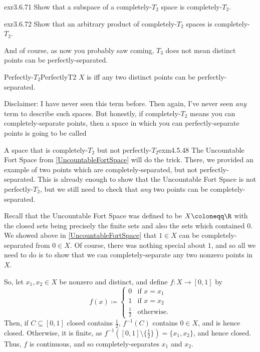 \begin{exr}{}{exr3.6.71}
Show that a subspace of a completely-$T_2$ space is completely-$T_2$.
\end{exr}
\begin{exr}{}{exr3.6.72}
Show that an arbitrary product of completely-$T_2$ spaces is completely-$T_2$.
\end{exr}

And of course, as now you probably saw coming, $T_3$ does not mean distinct points can be perfectly-separated.
\begin{dfn}{Perfectly-$T_2$}{PerfectlyT2}
$X$ is  iff any two distinct points can be perfectly-separated.
\begin{rmk}
Disclaimer:  I have never seen this term before.  Then again, I've never seen \emph{any} term to describe such spaces.  But honestly, if completely-$T_2$ means you can completely-separate points, then a space in which you can perfectly-separate points is going to be called \textellipsis
\end{rmk}
\end{dfn}
\begin{exm}{A space that is completely-$T_2$ but not perfectly-$T_2$}{exm4.5.48}
The Uncountable Fort Space from \cref{UncountableFortSpace} will do the trick.  There, we provided an example of two points which are completely-separated, but not perfectly-separated.  This is already enough to show that the Uncountable Fort Space is not perfectly-$T_2$, but we still need to check that \emph{any} two points can be completely-separated.

Recall that the Uncountable Fort Space was defined to be $X\coloneqq \R$ with the closed sets being precisely the finite sets and also the sets which contained $0$.  We showed above in \cref{UncountableFortSpace} that $1\in X$ can be completely-separated from $0\in X$.  Of course, there was nothing special about $1$, and so all we need to do is to show that we can completely-separate any two nonzero points in $X$.

So, let $x_1,x_2\in X$ be nonzero and distinct, and define $f\colon X\rightarrow [0,1]$ by
\begin{equation}
f(x)\coloneqq \begin{cases}0 & \text{if }x=x_1 \\ 1 & \text{if }x=x_2 \\ \tfrac{1}{2} & \text{otherwise.}\end{cases}
\end{equation}
Then, if $C\subseteq [0,1]$ closed contains $\frac{1}{2}$, $f^{-1}(C)$ contains $0\in X$, and is hence closed.  Otherwise, it is finite, as $f^{-1}\left( [0,1]\setminus \{ \frac{1}{2}\} \right) =\{ x_1,x_2\}$, and hence closed.  Thus, $f$ is continuous, and so completely-separates $x_1$ and $x_2$.
\end{exm}
